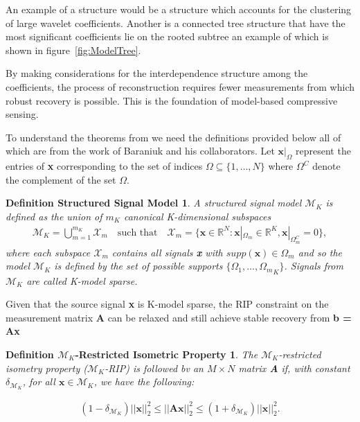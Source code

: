 \documentclass[titlepage,oneside, 12pt]{book}
\theoremstyle{break}
\begin{document}
An example of a structure would be a structure which accounts for the clustering of large wavelet coefficients. Another is a connected tree structure that have the most significant coefficients lie on the rooted subtree\cite{TreeSparse} an example of which is shown in figure~\ref{fig:ModelTree}.

By making considerations for the interdependence structure among the coefficients, the process of reconstruction requires fewer measurements from which robust recovery is possible. This is the foundation of model-based compressive sensing.

To understand the theorems from \cite{MBCS} we need the definitions provided below all of which are from the work of Baraniuk and his collaborators. Let $\textbf{x}|_{\Omega}$ represent the entries of \textbf{x} corresponding to the set of indices $\Omega \subseteq \{1, \ldots, N\}$ where $\Omega^{C}$ denote the complement of the set $\Omega$. 

\newtheorem*{SigMod}{Definition Structured Signal Model}
\begin{SigMod}
A structured signal model $\mathcal{M}_{K}$ is defined as the union of $m_{K}$ canonical K-dimensional  subspaces
\begin{equation}
\begin{gathered}
\mathcal{M}_{K} = \bigcup^{m_K}_{m = 1} \mathcal{X}_{m} \quad \text{such that} \quad \mathcal{X}_{m} = \big\{\textbf{x} \in \mathbb{R}^{N} : \textbf{x}|_{{\Omega}_{m}} \in \mathbb{R}^{K}, \textbf{x}|_{{\Omega}_{m}^{C}} = 0\big\},
\end{gathered}
\label{eqn:SigMod}
\end{equation}
where each subspace $\mathcal{X}_{m}$ contains all signals \textbf{x} with $supp(\textbf{x}) \in \Omega_{m}$ and so the model $\mathcal{M}_{K}$ is defined by the set of possible supports $\{\Omega_{1} , \ldots, {\Omega_{m}}_{K} \}$. Signals from $\mathcal{M}_{K}$ are called K-model sparse. 
\end{SigMod}

Given that the source signal \textbf{x} is K-model sparse, the RIP constraint on the measurement matrix \textbf{A} can be relaxed and still achieve stable recovery from \textbf{b = Ax}

\newtheorem*{MKRIP}{Definition $\mathcal{M}_{K}$-Restricted Isometric Property}
\begin{MKRIP}
The $\mathcal{M}_{K}$-restricted isometry property ($\mathcal{M}_{K}$-RIP) is followed bv an $M \times N$ matrix \textbf{A}  if, with constant $\delta_{\mathcal{M}_{K}}$, for all $\textbf{x} \in \mathcal{M}_{K}$, we have the following: 

\begin{equation}
\begin{gathered}
(1 - \delta_{\mathcal{M}_{K}})||\textbf{x}||^2_2 \leq ||\textbf{Ax}||^2_2 \leq (1 + \delta_{\mathcal{M}_{K}})||\textbf{x}||^2_2.
\end{gathered}
\label{eqn:MKRIP}
\end{equation}
\end{MKRIP}
\end{document}
